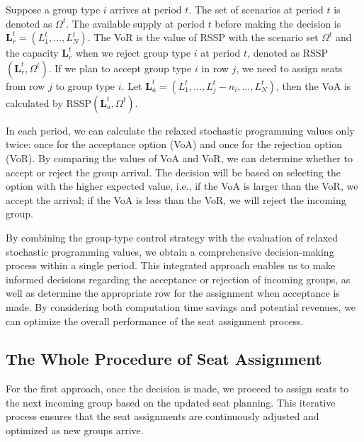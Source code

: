 Suppose a group type $i$ arrives at period $t$. The set of scenarios at period $t$ is denoted as $\Omega^{t}$. The available supply at period $t$ before making the decision is $\mathbf{L}_{r}^{t} = (L_1^{t}, \ldots, L_N^{t})$. The VoR is the value of RSSP with the scenario set $\Omega^{t}$ and the capacity $\mathbf{L}_{r}^{t}$ when we reject group type $i$ at period $t$, denoted as RSSP$(\mathbf{L}_{r}^{t}, \Omega^{t})$. If we plan to accept group type $i$ in row $j$, we need to assign seats from row $j$ to group type $i$. Let $\mathbf{L}_{a}^{t}= (L_1^{t}, \ldots, L_j^{t}-n_{i}, \ldots, L_N^{t})$, then the VoA is calculated by RSSP$(\mathbf{L}_{a}^{t}, \Omega^{t})$.

In each period, we can calculate the relaxed stochastic programming values only twice: once for the acceptance option (VoA) and once for the rejection option (VoR). By comparing the values of VoA and VoR, we can determine whether to accept or reject the group arrival. The decision will be based on selecting the option with the higher expected value, i.e., if the VoA is larger than the VoR, we accept the arrival; if the VoA is less than the VoR, we will reject the incoming group.



By combining the group-type control strategy with the evaluation of relaxed stochastic programming values, we obtain a comprehensive decision-making process within a single period. This integrated approach enables us to make informed decisions regarding the acceptance or rejection of incoming groups, as well as determine the appropriate row for the assignment when acceptance is made. By considering both computation time savings and potential revenues, we can optimize the overall performance of the seat assignment process.




\subsection{The Whole Procedure of Seat Assignment}
For the first approach, once the decision is made, we proceed to assign seats to the next incoming group based on the updated seat planning. This iterative process ensures that the seat assignments are continuously adjusted and optimized as new groups arrive.

